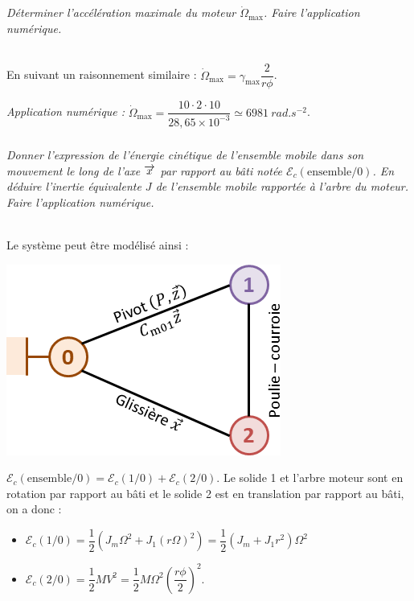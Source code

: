 \documentclass[10pt,fleqn]{article} %
\begin{document}
\begin{multicols}{2}
\begin{corrige}
\end{corrige}
\else
\fi

\subparagraph{}\textit{Déterminer l’accélération maximale du moteur $\dot{\Omega}_{\text{max}}$. Faire l’application numérique.}
\ifprof
\begin{corrige}~\\
En suivant un raisonnement similaire : 
$\dot{\Omega}_{\text{max}}=\gamma_{\text{max}}\dfrac{2}{r \phi}$. 


\textit{Application numérique : } $\dot{\Omega}_{\text{max}}=\dfrac{10\cdot 2\cdot 10}{ 28,65\times 10^{-3}}\simeq \SI{6981}{rad.s^{-2}}$. 


\end{corrige}
\else
\fi


\subparagraph{}\textit{Donner l’expression de l’énergie cinétique de l’ensemble mobile dans son mouvement le long de l’axe $\overrightarrow{x}$ par rapport au bâti notée $\mathcal{E}_c\left(\text{ensemble}/0\right)$. En déduire l’inertie équivalente $J$ de l’ensemble mobile rapportée à l’arbre du moteur. Faire l’application numérique.}
\ifprof
\begin{corrige}~\\
Le système peut être modélisé ainsi :

\begin{center}
\includegraphics[width=.7\linewidth]{images/cor_01}
\end{center}

$\mathcal{E}_c\left(\text{ensemble}/0\right) = \mathcal{E}_c\left(1/0\right)+\mathcal{E}_c\left(2/0\right)$. Le solide 1 et l'arbre moteur sont en rotation par rapport au bâti et le solide 2 est en translation par rapport au bâti, on a donc : 
\begin{itemize}
\item $\mathcal{E}_c\left(1/0\right) = \dfrac{1}{2}\left( J_m \Omega^2 + J_1 \left(r\Omega\right)^2\right)= \dfrac{1}{2}\left( J_m  + J_1 r^2\right)\Omega^2$
\item $\mathcal{E}_c\left(2/0\right) = \dfrac{1}{2} M V^2 = \dfrac{1}{2} M \Omega^2  \left(\dfrac{r\phi}{2}\right)^2$.
\end{itemize}


\end{corrige}
\end{multicols}
\end{document}
